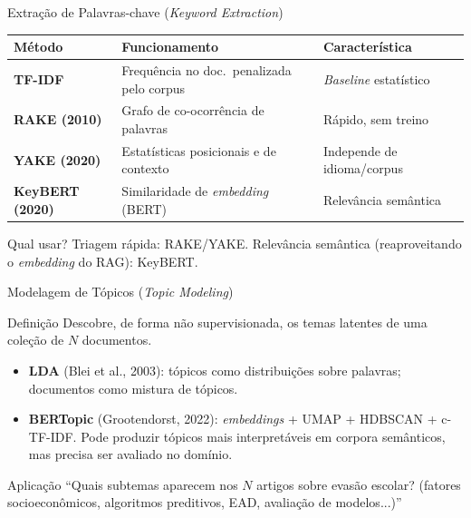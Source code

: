 \documentclass[aspectratio=169]{beamer}
\begin{document}
\begin{frame}[shrink=5]{Extração de Palavras-chave (\textit{Keyword Extraction})}
    \begin{center}\footnotesize
    \begin{tabular}{>{\bfseries}p{2.2cm}p{7.0cm}p{2.4cm}}
    \toprule
    Método & Funcionamento & Característica \\
    \midrule
    TF-IDF & Frequência no doc.\ penalizada pelo corpus & \textit{Baseline} estatístico \\
    RAKE (2010) & Grafo de co-ocorrência de palavras & Rápido, sem treino \\
    YAKE (2020) & Estatísticas posicionais e de contexto & Independe de idioma/corpus \\
    KeyBERT (2020) & Similaridade de \textit{embedding} (BERT) & Relevância semântica \\
    \bottomrule
    \end{tabular}
    \end{center}
    \pause
    \begin{block}{Qual usar?}
        \footnotesize Triagem rápida: RAKE/YAKE. Relevância semântica (reaproveitando o \textit{embedding} do RAG): KeyBERT.
    \end{block}
\end{frame}

\begin{frame}{Modelagem de Tópicos (\textit{Topic Modeling})}
    \begin{block}{Definição}
        \footnotesize Descobre, de forma não supervisionada, os temas latentes de uma coleção de $N$ documentos.
    \end{block}
    \pause
    \begin{itemize}\footnotesize
        \item \textbf{LDA} (Blei et al., 2003): tópicos como distribuições sobre palavras; documentos como mistura de tópicos.
        \item \textbf{BERTopic} (Grootendorst, 2022): \textit{embeddings} + UMAP + HDBSCAN + c-TF-IDF. Pode produzir tópicos mais interpretáveis em corpora semânticos, mas precisa ser avaliado no domínio.
    \end{itemize}
    \pause
    \begin{exampleblock}{Aplicação}
        \footnotesize ``Quais subtemas aparecem nos $N$ artigos sobre evasão escolar? (fatores socioeconômicos, algoritmos preditivos, EAD, avaliação de modelos...)''
    \end{exampleblock}
\end{frame}
\end{document}
